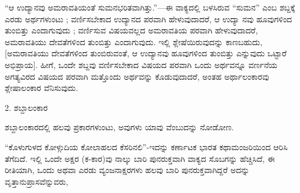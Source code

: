 
\indent “ಆ ಉದ್ಯಾನವು ಅಮರಾವತಿಯಂತೆ ಸುಮನಭರಿತವಾಗಿತ್ತು.”—ಈ ವಾಕ್ಯದಲ್ಲಿ ಬಳಸಿರುವ “ಸುಮನ” ಎಂಬ ಶಬ್ದಕ್ಕೆ ಎರಡು ಅರ್ಥಗಳುಂಟು ; ವರ್ಣಿಸಬೇಕಾದ ಉದ್ಯಾನದ ಪರವಾಗಿ ಹೇಳುವುದಾದರೆ, ಆ ಉದ್ಯಾ ನವು ಹೂವುಗಳಿಂದ ತುಂಬಿತ್ತು ಎಂದಾಗುವುದು ; ವರ್ಣಿಸುವ ವಿಷಯವಲ್ಲದ ಅಮರಾವತಿಯ ಪರವಾಗಿ ಹೇಳುವುದಾದರೆ, ಅಮರಾವತಿಯು ದೇವತೆಗಳಿಂದ ತುಂಬಿತ್ತು ಎಂದಾಗುವುದು. ಇಲ್ಲಿ ಶ್ಲೇಷೆಯಿರುವುದನ್ನು ಕಾಣಬಹುದು, {[}ಅಮರಾವತಿಯು ದೇವತೆಗಳಿಂದ ತುಂಬಿರುವಂತೆ, ಆ ಉದ್ಯಾನವು ಹೂವುಗಳಿಂದ ತುಂಬಿತ್ತು ಎನ್ನುವುದು ಒಟ್ಟಾರೆ ಅಭಿಪ್ರಾಯ{]}. ಹೀಗೆ, ಒಂದೇ ಶಬ್ದವು ವರ್ಣಿಸಬೇಕಾದ ವಿಷಯದ ಪರವಾಗಿ ಒಂದು ಅರ್ಥವನ್ನೂ ವರ್ಣನೆಯ ಅಗತ್ಯವಿರದ ವಿಷಯದ ಪರವಾಗಿ ಮತ್ತೊಂದು ಅರ್ಥವನ್ನು ಕೊಡುವುದಾದರೆ, ಅಂತಹ ಅರ್ಥಾಲಂಕಾರವು ಶ್ಲೇಷಾಲಂಕಾರ ವೆನಿಸುವುದು.\par

\vspace{7pt plus 6pt minus 1pt}\begin{center}{\kbvsecfont\fontsize{13pt}{16.5pt}\selectfont\color{kbvaccentdark} 2. ಶಬ್ದಾಲಂಕಾರ}\end{center}\vspace{3pt plus 3pt minus 1pt}

\indent ಶಬ್ದಾಲಂಕಾರದಲ್ಲಿ ಹಲವು ಪ್ರಕಾರಗಳುಂಟು, ಅವುಗಳು ಯಾವು ವೆಂಬುದನ್ನು ನೋಡೋಣ.\par


\indent “ಕೊಳುಗುಳದ ಕೋಳ್ಗುದಿಯ ಕೋಲಾಹಲದ ಕೆಸರಿನಲಿ”-ಇದನ್ನು ಕರ್ಣಾಟಕ ಭಾರತ ಕಥಾಮಂಜರಿಯಿಂದ ಆರಿಸಿ ತೆಗೆದಿದೆ. ಇಲ್ಲಿ ಒಂದೇ ಅಕ್ಷರ (ಕ-ಕಾರ)ವು ನಾಲ್ಕು ಬಾರಿ ಪುನರುಕ್ತವಾಗಿ ವಾಕ್ಯದ ಸೊಬಗನ್ನು ಹೆಚ್ಚಿಸಿದೆ, ಈ ರೀತಿಯಾಗಿ, ಒಂದು ಅಥವಾ ಎರಡು ವ್ಯಂಜನಾಕ್ಷರಗಳು ಹಲವು ಬಾರಿ ಪುನರುಕ್ತವಾಗಿದ್ದರೆ ಅದನ್ನು ವೃತ್ತಾನುಪ್ರಾಸವೆನ್ನುವರು,\par
